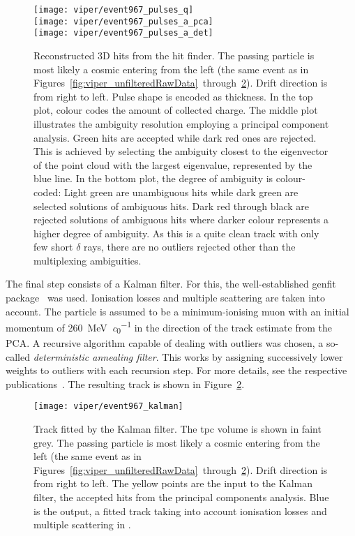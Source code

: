 \begin{figure}[htb]
	\centering
	\texttt{[image: viper/event967\_pulses\_q]} \\
	\texttt{[image: viper/event967\_pulses\_a\_pca]} \\
	\texttt{[image: viper/event967\_pulses\_a\_det]}
	\caption{Reconstructed 3D hits from the hit finder.
		The passing particle is most likely a cosmic \Pgm entering from the left (the same event as in Figures~\ref{fig:viper_unfilteredRawData}~through~\ref{fig:viper_kalman}).
		Drift direction is from right to left.
		Pulse shape is encoded as thickness.
		In the top plot, colour codes the amount of collected charge.
		The middle plot illustrates the ambiguity resolution employing a principal component analysis.
		Green hits are accepted while dark red ones are rejected.
		This is achieved by selecting the ambiguity closest to the eigenvector of the point cloud with the largest eigenvalue, represented by the blue line.
		In the bottom plot, the degree of ambiguity is colour-coded: Light green are unambiguous hits while dark green are selected solutions of ambiguous hits.
		Dark red through black are rejected solutions of ambiguous hits where darker colour represents a higher degree of ambiguity.
		As this is a quite clean track with only few short $\delta$ rays, there are no outliers rejected other than the multiplexing ambiguities.}
	\label{fig:viper_pca}
\end{figure}

The final step consists of a Kalman filter.
For this, the well-established \gls{genfit} package~\cite{genfit1, genfit2} was used.
Ionisation losses and multiple scattering are taken into account.
The particle is assumed to be a minimum-ionising muon with an initial momentum of \SI{260}{\mega\electronvolt\per\clight} in the direction of the track estimate from the PCA.
A recursive algorithm capable of dealing with outliers was chosen, a so-called \emph{deterministic annealing filter}.
This works by assigning successively lower weights to outliers with each recursion step.
For more details, see the respective publications~\cite{genfit1, genfit2}.
The resulting track is shown in Figure~\ref{fig:viper_kalman}.

\begin{figure}[htb]
	\centering
	\texttt{[image: viper/event967\_kalman]}
	\caption{Track fitted by the Kalman filter.
	The \gls{tpc} volume is shown in faint grey.
	The passing particle is most likely a cosmic \Pgm entering from the left (the same event as in Figures~\ref{fig:viper_unfilteredRawData}~through~\ref{fig:viper_kalman}).
	Drift direction is from right to left.
	The yellow points are the input to the Kalman filter, the accepted hits from the principal components analysis.
	Blue is the output, a fitted track taking into account ionisation losses and multiple scattering in \lar{}.}
	\label{fig:viper_kalman}
\end{figure}

